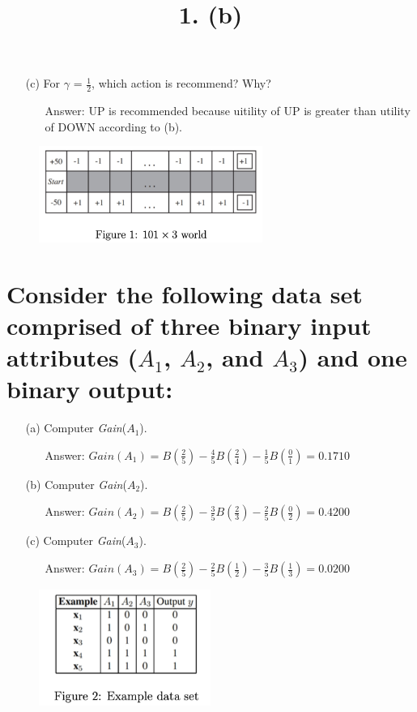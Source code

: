 \documentclass{article}
\begin{document}
\begin{itemize}
\begin{figure}[h!]
			\title{1. (b)}
		\end{figure}
		\item[(c)]For $\gamma$ = $\frac{1}{2}$, which action is recommend? Why?
		\begin{itemize}
			\item[Answer:]UP is recommended because uitility of UP is greater than utility of DOWN according to (b).
		\end{itemize}
	\end{itemize}
	\begin{figure}[h!]
		\centering
		\includegraphics[width=0.65\textwidth]{fig1.png}
	\end{figure}
\section{Consider the following data set comprised of three binary input attributes ($A_1$, $A_2$, and $A_3$) and one binary output:}
	\begin{itemize}
		\item[(a)]Computer \textit{Gain}($A_1$).
			\begin{itemize}
				\item[Answer:]$Gain(A_1)=B(\frac{2}{5})-\frac{4}{5}B(\frac{2}{4})-\frac{1}{5}B(\frac{0}{1})=0.1710$
			\end{itemize}
		\item[(b)]Computer \textit{Gain}($A_2$).
			\begin{itemize}
				\item[Answer:]$Gain(A_2)=B(\frac{2}{5})-\frac{3}{5}B(\frac{2}{3})-\frac{2}{5}B(\frac{0}{2})=0.4200$
			\end{itemize}
		\item[(c)]Computer \textit{Gain}($A_3$).
			\begin{itemize}
				\item[Answer:]$Gain(A_3)=B(\frac{2}{5})-\frac{2}{5}B(\frac{1}{2})-\frac{3}{5}B(\frac{1}{3})=0.0200$
			\end{itemize}
	\end{itemize}
	\begin{figure}[h!]
		\centering
		\includegraphics[width=0.5\textwidth]{fig2.png}
	\end{figure}
	
\end{document}
